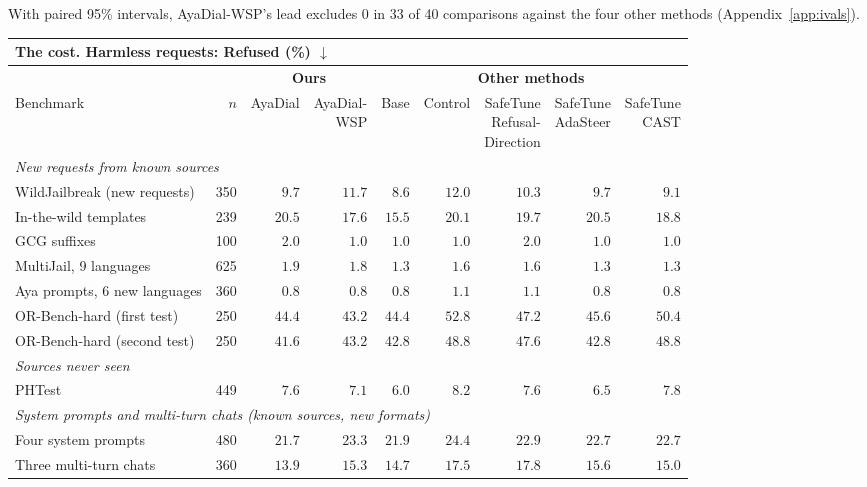 \documentclass[10pt,a4paper]{article}
\renewcommand{\arraystretch}{1.12}
\begin{document}
With paired 95\% intervals, AyaDial-WSP's lead excludes 0 in 33 of 40 comparisons against the four other methods (Appendix~\ref{app:ivals}).

\begin{table}[H]\centering\small\renewcommand{\arraystretch}{1.35}\setlength{\tabcolsep}{5pt}\begin{tabular}{|l|r|r|r||r|r|r|r|r|}\hline
\multicolumn{9}{|l|}{\textbf{The cost. Harmless requests: Refused (\%) $\downarrow$}}\\\hline
\multicolumn{2}{|c|}{} & \multicolumn{2}{c||}{\textbf{Ours}} & \multicolumn{5}{c|}{\textbf{Other methods}}\\\hline
Benchmark & $n$ & AyaDial & \makecell{AyaDial-\\WSP} & Base & Control & \makecell{SafeTune\\Refusal-\\Direction} & \makecell{SafeTune\\AdaSteer} & \makecell{SafeTune\\CAST}\\\hline
\multicolumn{9}{|l|}{\cellcolor{black!6}\textit{New requests from known sources}}\\\hline
WildJailbreak (new requests) & 350 & $9.7$ & $11.7$ & $8.6$ & $12.0$ & $10.3$ & $9.7$ & $9.1$\\\hline
In-the-wild templates & 239 & $20.5$ & \cellcolor{win}$\mathbf{17.6}$ & $15.5$ & $20.1$ & $19.7$ & $20.5$ & $18.8$\\\hline
GCG suffixes & 100 & $2.0$ & $1.0$ & $1.0$ & $1.0$ & $2.0$ & $1.0$ & $1.0$\\\hline
MultiJail, 9 languages & 625 & $1.9$ & $1.8$ & $1.3$ & $1.6$ & $1.6$ & $1.3$ & $1.3$\\\hline
Aya prompts, 6 new languages & 360 & $0.8$ & $0.8$ & $0.8$ & $1.1$ & $1.1$ & $0.8$ & $0.8$\\\hline
OR-Bench-hard (first test) & 250 & $44.4$ & \cellcolor{win}$\mathbf{43.2}$ & $44.4$ & $52.8$ & $47.2$ & $45.6$ & $50.4$\\\hline
OR-Bench-hard (second test) & 250 & \cellcolor{win}$\mathbf{41.6}$ & $43.2$ & $42.8$ & $48.8$ & $47.6$ & $42.8$ & $48.8$\\\hline
\multicolumn{9}{|l|}{\cellcolor{black!6}\textit{Sources never seen}}\\\hline
PHTest & 449 & $7.6$ & $7.1$ & $6.0$ & $8.2$ & $7.6$ & $6.5$ & $7.8$\\\hline
\multicolumn{9}{|l|}{\cellcolor{black!6}\textit{System prompts and multi-turn chats (known sources, new formats)}}\\\hline
Four system prompts & 480 & \cellcolor{win}$\mathbf{21.7}$ & $23.3$ & $21.9$ & $24.4$ & $22.9$ & $22.7$ & $22.7$\\\hline
Three multi-turn chats & 360 & \cellcolor{win}$\mathbf{13.9}$ & $15.3$ & $14.7$ & $17.5$ & $17.8$ & $15.6$ & $15.0$\\\hline
\end{tabular}\end{table}
\end{document}
